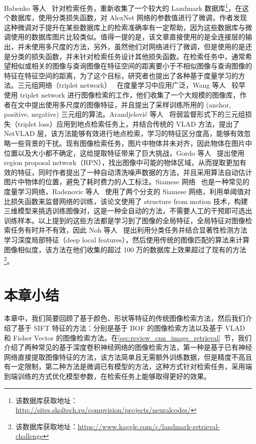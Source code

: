 Babenko 等人~\cite{Babenko2014NeuralCF} 针对检索任务，重新收集了一个较大的 Landmark 数据库\footnote{该数据库获取地址：\url{http://sites.skoltech.ru/compvision/projects/neuralcodes/}}，在这个数据库，使用分类损失函数，对 AlexNet 网络的参数值进行了微调，作者发现这种微调对于提升在某些数据库上的检索准确率有一定帮助，因为这些数据库与微调使用的数据库图片比较类似。值得一提的是，该文章直接使用的是全连接层的输出，并未使用多尺度的方法，另外，虽然他们对网络进行了微调，但是使用的是还是分类的损失函数，并未针对检索任务设计其他损失函数。在检索任务中，通常希望相似或相关的图像与查询图像在特征空间的距离要小于不相似图像与查询图像的特征在特征空间的距离，为了这个目标，研究者也提出了各种基于度量学习的方法。三元组网络（triplet network）~\cite{Wang2014LearningFI,Schroff2015FaceNetAU} 在度量学习中应用广泛，Wang 等人~\cite{Wang2014LearningFI} 较早使用 triplet network 进行图像检索的工作，他们收集了一个大规模的图像库，作者在文中提出使用多尺度的图像特征，并且提出了采样训练所用的 (anchor, positive, negative) 三元组的算法。Arandjelovi{\'c} 等人~\cite{Arandjelovic2016NetVLADCA} 将弱监督形式下的三元组损失（triplet loss）应用到地点检索任务上，并结合传统的 VLAD 方法，提出了 NetVLAD 层，该方法能够有效进行地点检索，学习的特征区分度高，能够有效忽略一些背景的干扰。现有图像检索任务，图片中物体并未对齐，因此物体在图片中位置以及大小都不确定，这给提取特征带来了巨大挑战，Gordo 等人~\cite{Gordo2016DeepIR} 提出使用 region proposal network（RPN），找出图像中可能的物体区域，从而提取更加有效的特征，同时作者提出了一种自动清洗噪声数据的方法，并且采用算法自动估计图片中物体的位置，避免了耗时费力的人工标注。Siamese 网络~\cite{Bell2015LearningVS,Hadsell2006DimensionalityRB} 也是一种常见的度量学习网络，Radenovic 等人~\cite{Radenovic2016CNNIR} 使用了两个分支的 Siamese 网络，利用单阈值对比损失函数来监督网络的训练，该论文使用了 structure from motion 技术，构建三维模型来挑选训练图像对，这是一种全自动的方法，不需要人工的干预即可选出训练样本。以上提到的这些方法都是学习到了图像的全局特征，全局特征对图像检索任务有时并不有效，因此 Noh 等人~\cite{Noh2017LargeScaleIR} 提出利用分类任务并结合显著性检测方法学习深度局部特征（deep local features），然后使用传统的图像匹配的算法来计算图像相似度，该方法在他们收集的超过 100 万的数据库上效果超过了现有的方法\footnote{该数据库获取地址：\url{https://www.kaggle.com/c/landmark-retrieval-challenge}}。


\section{本章小结}\label{sec:related_work_conclusion}
本章中，我们简要回顾了基于颜色、形状等特征的传统图像检索方法，然后我们介绍了基于 SIFT 特征的方法：分别是基于 BOF 的图像检索方法以及基于 VLAD 和 Fisher Vector 的图像检索方法。在\ref{sec:review_cnn_image_retrieval}~节，我们介绍了两种常见的基于深度卷积神经网络的图像检索方法，第一种是基于已有神经网络直接提取图像特征的方法，该方法简单且无需额外训练数据，但是精度不高且有一定限制，第二种方法是微调已有模型的方法，这种方式针对检索任务，采用端到端训练的方式优化模型参数，在检索任务上能够取得更好的效果。
